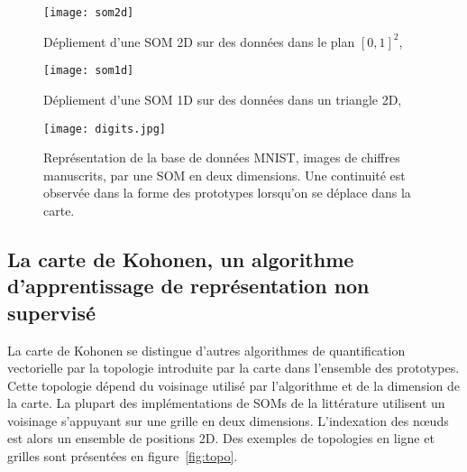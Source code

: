 \documentclass[../main]{subfiles}
\begin{document}
    \begin{figure}
        \centering
        \texttt{[image: som2d]}
        \caption{Dépliement d'une SOM 2D sur des données dans le plan $[0,1]^2$, \cite{Kohonen1995SelfOrganizingM} \label{fig:som2d}}
        \end{figure}
    
    \begin{figure}
    \centering
    \texttt{[image: som1d]}
    \caption{Dépliement d'une SOM 1D sur des données dans un triangle 2D, \cite{Kohonen1995SelfOrganizingM}\label{fig:som1d}}
    \end{figure}

\begin{figure}
    \centering
    \texttt{[image: digits.jpg]}
    \caption{Représentation de la base de données MNIST, images de chiffres manuscrits, par une SOM en deux dimensions. Une continuité est observée dans la forme des prototypes lorsqu'on se déplace dans la carte. \label{fig:digits}}
    \end{figure}
    
    
\subsection{La carte de Kohonen, un algorithme d'apprentissage de représentation non supervisé}

La carte de Kohonen se distingue d'autres algorithmes de quantification vectorielle par la topologie introduite par la carte dans l'ensemble des prototypes. Cette topologie dépend du voisinage utilisé par l'algorithme et de la dimension de la carte.
La plupart des implémentations de SOMs de la littérature utilisent un voisinage s'appuyant sur une grille en deux dimensions. L'indexation des n\oe{}uds est alors un ensemble de positions 2D. Des exemples de topologies en ligne et grilles sont présentées en figure~\ref{fig:topo}. 
\end{document}
